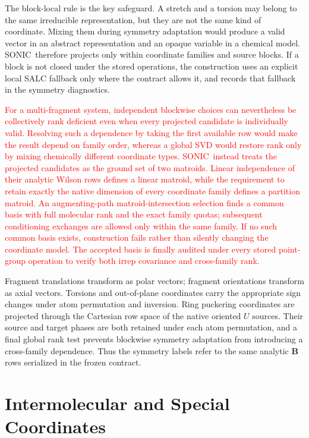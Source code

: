 \documentclass[journal=jctcce,manuscript=article,layout=traditional]{achemso}
\newcommand{\SONIC}{SONIC}
\newcommand{\Bmat}{\mathbf{B}}
\theoremstyle{definition}
\begin{document}
The block-local rule is the key safeguard.  A stretch and a torsion may
belong to the same irreducible representation, but they are not the same kind
of coordinate.  Mixing them during symmetry adaptation would produce a valid
vector in an abstract representation and an opaque variable in a chemical
model.  \SONIC\ therefore projects only within coordinate families and source
blocks.  If a block is not closed under the stored operations, the construction uses
an explicit local SALC fallback only where the contract allows it, and records
that fallback in the symmetry diagnostics.

\textcolor{red}{For a multi-fragment system, independent blockwise choices can
nevertheless be collectively rank deficient even when every projected
candidate is individually valid.  Resolving such a dependence by taking the
first available row would make the result depend on family order, whereas a
global SVD would restore rank only by mixing chemically different coordinate
types.  \SONIC\ instead treats the projected candidates as the ground set of
two matroids.  Linear independence of their analytic Wilson rows defines a
linear matroid, while the requirement to retain exactly the native dimension
of every coordinate family defines a partition matroid.  An augmenting-path
matroid-intersection selection finds a common basis with full molecular rank
and the exact family quotas; subsequent conditioning exchanges are allowed
only within the same family.\cite{GabowXu1996} If no such common basis exists,
construction fails rather than silently changing the coordinate model.  The
accepted basis is finally audited under every stored point-group operation to
verify both irrep covariance and cross-family rank.}

Fragment translations transform as polar vectors; fragment orientations
transform as axial vectors.  Torsions and out-of-plane coordinates carry the
appropriate sign changes under atom permutation and inversion.  Ring puckering
coordinates are projected through the Cartesian row space of the native
oriented \(U\) sources.  Their source and target phases are both retained under
each atom permutation, and a final global rank test prevents blockwise
symmetry adaptation from introducing a cross-family dependence.  Thus the
symmetry labels refer to the same analytic \(\Bmat\) rows serialized in the
frozen contract.

\section{Intermolecular and Special Coordinates}
\end{document}
